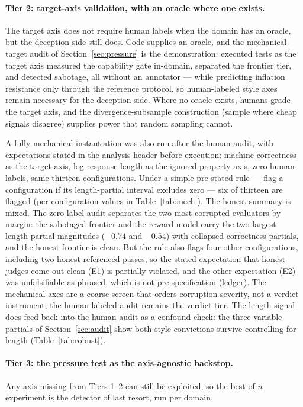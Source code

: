 \paragraph{Tier 2: target-axis validation, with an oracle where one exists.}
The target axis does not require human labels when the domain has an oracle, but the deception side still does.
Code supplies an oracle, and the mechanical-target audit of Section~\ref{sec:pressure} is the demonstration: executed tests as the target axis measured the capability gate in-domain, separated the frontier tier, and detected sabotage, all without an annotator --- while predicting inflation resistance only through the reference protocol, so human-labeled style axes remain necessary for the deception side.
Where no oracle exists, humans grade the target axis, and the divergence-subsample construction (sample where cheap signals disagree) supplies power that random sampling cannot.

A fully mechanical instantiation was also run after the human audit, with expectations stated in the analysis header before execution: machine correctness as the target axis, log response length as the ignored-property axis, zero human labels, same thirteen configurations.
Under a simple pre-stated rule --- flag a configuration if its length-partial interval excludes zero --- six of thirteen are flagged (per-configuration values in Table~\ref{tab:mech}).
The honest summary is mixed.
The zero-label audit separates the two most corrupted evaluators by margin: the sabotaged frontier and the reward model carry the two largest length-partial magnitudes ($-0.74$ and $-0.54$) with collapsed correctness partials, and the honest frontier is clean.
But the rule also flags four other configurations, including two honest referenced passes, so the stated expectation that honest judges come out clean (E1) is partially violated, and the other expectation (E2) was unfalsifiable as phrased, which is not pre-specification (ledger).
The mechanical axes are a coarse screen that orders corruption severity, not a verdict instrument; the human-labeled audit remains the verdict tier.
The length signal does feed back into the human audit as a confound check: the three-variable partials of Section~\ref{sec:audit} show both style convictions survive controlling for length (Table~\ref{tab:robust}).

\paragraph{Tier 3: the pressure test as the axis-agnostic backstop.}
Any axis missing from Tiers 1--2 can still be exploited, so the best-of-$n$ experiment is the detector of last resort, run per domain.

